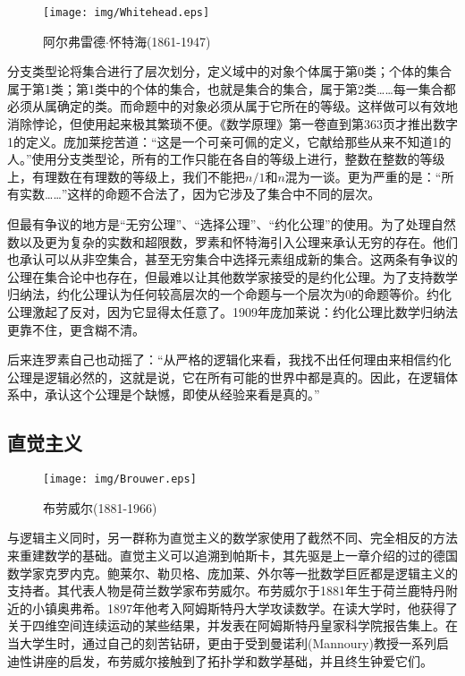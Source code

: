 \documentclass{article}
\begin{document}
\begin{wrapfigure}{R}{0.4\textwidth}
 \centering
 \texttt{[image: img/Whitehead.eps]}
 \captionsetup{labelformat=empty}
 \caption{阿尔弗雷德$\cdot$怀特海(1861-1947)}
 \label{fig:Whitehead}
\end{wrapfigure}

分支类型论将集合进行了层次划分，定义域中的对象个体属于第0类；个体的集合属于第1类；第1类中的个体的集合，也就是集合的集合，属于第2类……每一集合都必须从属确定的类。而命题中的对象必须从属于它所在的等级。这样做可以有效地消除悖论，但使用起来极其繁琐不便。《数学原理》第一卷直到第363页才推出数字1的定义。庞加莱挖苦道：“这是一个可亲可佩的定义，它献给那些从来不知道1的人。”使用分支类型论，所有的工作只能在各自的等级上进行，整数在整数的等级上，有理数在有理数的等级上，我们不能把$n/1$和$n$混为一谈。更为严重的是：“所有实数……”这样的命题不合法了，因为它涉及了集合中不同的层次。

但最有争议的地方是“无穷公理”、“选择公理”、“约化公理”的使用。为了处理自然数以及更为复杂的实数和超限数，罗素和怀特海引入公理来承认无穷的存在。他们也承认可以从非空集合，甚至无穷集合中选择元素组成新的集合。这两条有争议的公理在集合论中也存在，但最难以让其他数学家接受的是约化公理。为了支持数学归纳法，约化公理认为任何较高层次的一个命题与一个层次为0的命题等价。约化公理激起了反对，因为它显得太任意了。1909年庞加莱说：约化公理比数学归纳法更靠不住，更含糊不清。

后来连罗素自己也动摇了：“从严格的逻辑化来看，我找不出任何理由来相信约化公理是逻辑必然的，这就是说，它在所有可能的世界中都是真的。因此，在逻辑体系中，承认这个公理是个缺憾，即使从经验来看是真的。”\cite{M-Kline-2007}

\subsection{直觉主义}

\begin{wrapfigure}{L}{0.4\textwidth}
 \centering
 \texttt{[image: img/Brouwer.eps]}
 \captionsetup{labelformat=empty}
 \caption{布劳威尔(1881-1966)}
 \label{fig:Brouwer}
\end{wrapfigure}

与逻辑主义同时，另一群称为直觉主义的数学家使用了截然不同、完全相反的方法来重建数学的基础。直觉主义可以追溯到帕斯卡，其先驱是上一章介绍的过的德国数学家克罗内克。鲍莱尔、勒贝格、庞加莱、外尔等一批数学巨匠都是逻辑主义的支持者。其代表人物是荷兰数学家布劳威尔。布劳威尔于1881年生于荷兰鹿特丹附近的小镇奥弗希。1897年他考入阿姆斯特丹大学攻读数学。在读大学时，他获得了关于四维空间连续运动的某些结果，并发表在阿姆斯特丹皇家科学院报告集上。在当大学生时，通过自己的刻苦钻研，更由于受到曼诺利(Mannoury)教授一系列启迪性讲座的启发，布劳威尔接触到了拓扑学和数学基础，并且终生钟爱它们。
\end{document}
